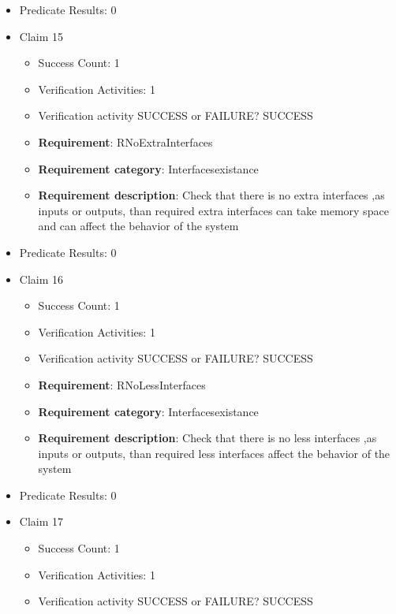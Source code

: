 \documentclass{article}
\begin{document}
\begin{itemize}
\begin{itemize}
				\end{itemize}
				
									    
				\item Predicate Results: 0

  				  \item Claim 15
				\begin{itemize}
			    	\item Success Count: 1 
			    	\item Verification Activities: 1
					\item Verification activity SUCCESS or FAILURE? SUCCESS
		
						\item \textbf{Requirement}: RNoExtraInterfaces 
						\item \textbf{Requirement category}: Interfacesexistance 
						\item \textbf{Requirement description}: Check that there is no extra interfaces ,as inputs or outputs, than required  extra interfaces can take memory space and can affect the behavior of the system
					
				\end{itemize}
				
									    
				\item Predicate Results: 0

  				  \item Claim 16
				\begin{itemize}
			    	\item Success Count: 1 
			    	\item Verification Activities: 1
					\item Verification activity SUCCESS or FAILURE? SUCCESS
		
						\item \textbf{Requirement}: RNoLessInterfaces 
						\item \textbf{Requirement category}: Interfacesexistance 
						\item \textbf{Requirement description}: Check that there is no less interfaces ,as inputs or outputs, than required  less interfaces affect the behavior of the system
					
				\end{itemize}
				
									    
				\item Predicate Results: 0

  				  \item Claim 17
				\begin{itemize}
			    	\item Success Count: 1 
			    	\item Verification Activities: 1
					\item Verification activity SUCCESS or FAILURE? SUCCESS
		

\end{itemize}
\end{itemize}
\end{document}
